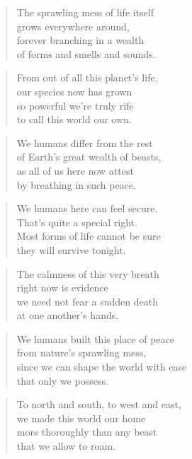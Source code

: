 \documentclass[10pt,a4paper]{article}
\begin{document}
\begin{paracol}{2}
\begin{verse}
The sprawling mess of life itself\\
grows everywhere around,\\
forever branching in a wealth\\
of forms and smells and sounds.
\end{verse}

\begin{verse}
From out of all this planet’s life,\\
our species now has grown\\
so powerful we’re truly rife\\
to call this world our own.
\end{verse}

\begin{verse}
We humans differ from the rest\\
of Earth’s great wealth of beasts,\\
as all of us here now attest\\
by breathing in such peace.
\end{verse}

\begin{verse}
We humans here can feel secure.\\
That’s quite a special right.\\
Most forms of life cannot be sure\\
they will survive tonight.
\end{verse}

\begin{verse}
The calmness of this very breath\\
right now is evidence\\
we need not fear a sudden death\\
at one another’s hands.
\end{verse}

\begin{verse}
We humans built this place of peace\\
from nature’s sprawling mess,\\
since we can shape the world with ease\\
that only we possess.
\end{verse}

\begin{verse}
To north and south, to west and east,\\
we made this world our home\\
more thoroughly than any beast\\
that we allow to roam.
\end{verse}


\end{paracol}
\end{document}
